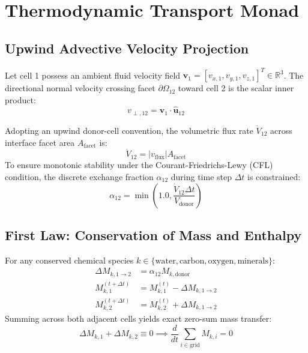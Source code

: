\documentclass[11pt,a4paper]{article}
\theoremstyle{definition}
\begin{document}
\section{Thermodynamic Transport Monad}

\subsection{Upwind Advective Velocity Projection}

Let cell 1 possess an ambient fluid velocity field $\mathbf{v}_1 = [v_{x,1}, v_{y,1}, v_{z,1}]^T \in \mathbb{R}^3$. The directional normal velocity crossing facet $\partial \Omega_{12}$ toward cell 2 is the scalar inner product:
\begin{equation}
v_{\perp, 12} = \mathbf{v}_1 \cdot \hat{\mathbf{u}}_{12}
\end{equation}

Adopting an upwind donor-cell convention, the volumetric flux rate $\dot{V}_{12}$ across interface facet area $A_{\text{facet}}$ is:
\begin{equation}
\dot{V}_{12} = |v_{\text{flux}}| A_{\text{facet}}
\end{equation}
To ensure monotonic stability under the Courant-Friedrichs-Lewy (CFL) condition, the discrete exchange fraction $\alpha_{12}$ during time step $\Delta t$ is constrained:
\begin{equation}
\alpha_{12} = \min\left(1.0, \frac{\dot{V}_{12} \Delta t}{V_{\text{donor}}}\right)
\end{equation}

\subsection{First Law: Conservation of Mass and Enthalpy}

For any conserved chemical species $k \in \{\text{water}, \text{carbon}, \text{oxygen}, \text{minerals}\}$:
\begin{align}
\Delta M_{k, 1\to 2} &= \alpha_{12} M_{k, \text{donor}} \\
M_{k, 1}^{(t+\Delta t)} &= M_{k, 1}^{(t)} - \Delta M_{k, 1\to 2} \\
M_{k, 2}^{(t+\Delta t)} &= M_{k, 2}^{(t)} + \Delta M_{k, 1\to 2}
\end{align}
Summing across both adjacent cells yields exact zero-sum mass transfer:
\begin{equation}
\Delta M_{k, 1} + \Delta M_{k, 2} \equiv 0 \implies \frac{d}{dt} \sum_{i \in \text{grid}} M_{k, i} = 0
\end{equation}
\end{document}

